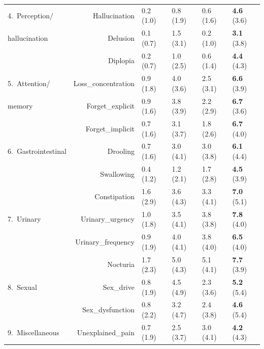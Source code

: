 \documentclass[preprint,5p]{elsarticle} %
\begin{document}
\begin{table}[t]
\begin{threeparttable}
\begin{tabular}{lrllll}
  \midrule
  4.\ Perception/ & Hallucination & 0.2 (1.0)\tnote{234} & 0.8 (1.9)\tnote{14} & 0.6 (1.6)\tnote{14} & \textbf{4.6} (3.6)\tnote{123} \\
  hallucination &Delusion & 0.1 (0.7)\tnote{24} & 1.5 (3.1)\tnote{124} & 0.2 (1.0)\tnote{24} &
  \textbf{3.1} (3.8)\tnote{123} \\
  &Diplopia & 0.2 (0.7)\tnote{234} & 1.0 (2.5)\tnote{14} & 0.6 (1.4)\tnote{14} & \textbf{4.4}
  (4.3)\tnote{123} \\
  \midrule
  5.\ Attention/ & Loss\_concentration & 0.9 (1.8)\tnote{234} & 4.0 (3.6)\tnote{134} & 2.5 (3.1)\tnote{124} & \textbf{6.6} (3.9)\tnote{123} \\
  memory &Forget\_explicit & 0.9 (1.6)\tnote{234} & 3.8 (3.9)\tnote{134} & 2.2 (2.9)\tnote{124} & \textbf{6.7} (3.6)\tnote{123} \\
  &Forget\_implicit & 0.7 (1.6)\tnote{234} & 3.1 (3.7)\tnote{134} & 1.8 (2.6)\tnote{124} & \textbf{6.7} (4.0)\tnote{123} \\
  \midrule
  6.\ Gastrointestinal &
  Drooling & 0.7 (1.6)\tnote{234} & 3.0 (4.1)\tnote{14} & 3.0 (3.8)\tnote{14} & \textbf{6.1} (4.4)\tnote{123} \\
  &Swallowing & 0.4 (1.2)\tnote{234} & 1.2 (2.1)\tnote{14} & 1.7 (2.8)\tnote{14} & \textbf{4.5} (3.9)\tnote{123} \\
  &Constipation & 1.6 (2.9)\tnote{234} & 3.6 (4.3)\tnote{14} & 3.3 (4.1)\tnote{14} & \textbf{7.0} (5.1)\tnote{123} \\
  \midrule
  7.\ Urinary &
  Urinary\_urgency & 1.0 (1.8)\tnote{234} & 3.5 (4.1)\tnote{14} & 3.8 (3.8)\tnote{14} & \textbf{7.8} (4.0)\tnote{123} \\
  &Urinary\_frequency & 0.9 (1.9)\tnote{234} & 4.0 (4.1)\tnote{14} & 3.8 (4.0)\tnote{14} & \textbf{6.5} (4.0)\tnote{123} \\
  &Nocturia & 1.7 (2.3)\tnote{234} & 5.0 (4.3)\tnote{14} & 5.1 (4.1)\tnote{14} & \textbf{7.7} (3.9)\tnote{123} \\
  \midrule
  8.\ Sexual &
  Sex\_drive & 0.8 (1.9)\tnote{234} & 4.5 (4.9)\tnote{13} & 2.3 (3.6)\tnote{124} & \textbf{5.2} (5.4)\tnote{13} \\
  &Sex\_dysfunction & 0.8 (2.2)\tnote{234} & 3.2 (4.7)\tnote{1} & 2.4 (3.8)\tnote{14} &
  \textbf{4.6} (5.4)\tnote{13} \\
  \midrule
  9.\ Miscellaneous &
  Unexplained\_pain & 0.7 (1.9)\tnote{234} & 2.5 (3.7)\tnote{14} & 3.0 (4.1)\tnote{14} & \textbf{4.2} (4.3)\tnote{123} \\

\end{tabular}
\end{threeparttable}
\end{table}
\end{document}
